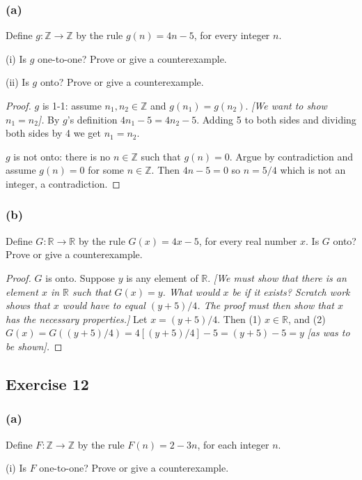 \documentclass[14pt]{extarticle}
\newcommand{\R}{\mathbb{R}}
\newcommand{\Z}{\mathbb{Z}}
\begin{document}
\subsubsection{(a)}
Define \(g: \Z \to \Z\) by the rule \(g(n) = 4n - 5\), for every integer $n$.

(i) Is $g$ one-to-one? Prove or give a counterexample.

(ii) Is $g$ onto? Prove or give a counterexample.

\begin{proof}
    $g$ is 1-1: assume \(n_1, n_2 \in \Z\) and \(g(n_1) = g(n_2)\). {\it [We want to show \(n_1 = n_2\)].} By $g$'s
    definition \(4n_1-5=4n_2-5\). Adding 5 to both sides and dividing both sides by 4 we get \(n_1 = n_2\).

    $g$ is not onto: there is no $n \in \Z$ such that $g(n) = 0$. Argue by contradiction and assume \(g(n) = 0\) for some
    \(n \in \Z\). Then \(4n-5 = 0\) so \(n = 5/4\) which is not an integer, a contradiction.
\end{proof}

\subsubsection{(b)}
Define \(G: \R \to \R\) by the rule \(G(x) = 4x - 5\), for every real number $x$. Is $G$ onto? Prove or give a counterexample.

\begin{proof}
    $G$ is onto. Suppose $y$ is any element of $\R$. {\it [We must show that there is an element $x$ in $\R$ such that
                \(G(x) = y\). What would $x$ be if it exists? Scratch work shows that $x$ would have to equal \((y + 5)/4\). The proof
                must then show that $x$ has the necessary properties.]} Let \(x = (y + 5)/4\). Then (1) \(x \in \R\), and (2) \(G(x) =
    G((y + 5)/4) = 4[(y + 5)/4] - 5 = (y + 5) - 5 = y\) {\it [as was to be shown].}
\end{proof}

\subsection{Exercise 12}
\subsubsection{(a)}
Define \(F: \Z \to \Z\) by the rule \(F(n) = 2 - 3n\), for each integer $n$.

(i) Is $F$ one-to-one? Prove or give a counterexample.
\end{document}
